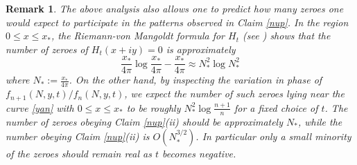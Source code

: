 \documentclass[a4paper,11pt,twoside]{amsart}
\newtheorem{remark}[theorem]{Remark}
\begin{document}
\begin{remark}  The above analysis also allows one to predict how many zeroes one would expect to participate in the patterns observed in Claim \ref{nup}.  In the region $0 \leq x \leq x_*$, the Riemann-von Mangoldt formula for $H_t$ (see \cite[Theorem 4.2]{brad}) shows that the number of zeroes of $H_t(x+iy)=0$ is approximately
$$ \frac{x_*}{4\pi} \log \frac{x_*}{4\pi} - \frac{x_*}{4\pi} \approx N_*^2 \log N_*^2 $$
where $N_* := \frac{x_*}{4\pi}$.  On the other hand, by inspecting the variation in phase of $f_{n+1}(N,y,t)/f_n(N,y,t)$, we expect the number of such zeroes lying near the curve \eqref{yan} with $0 \leq x \leq x_*$ to be roughly $N_*^2 \log \frac{n+1}{n}$ for a fixed choice of $t$.  The number of zeroes obeying Claim \ref{nup}(ii) should be approximately $N_*$, while the number obeying Claim \ref{nup}(ii) is $O( N_*^{3/2})$.  In particular only a small minority of the zeroes should remain real as $t$ becomes negative.
\end{remark}
\end{document}
